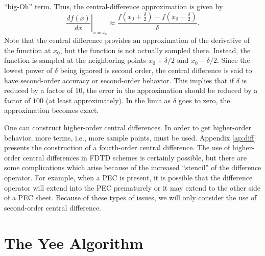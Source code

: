 ``big-Oh'' term.  Thus, the central-difference approximation is given
by
\begin{equation}
  \left.\frac{df(x)}{dx}\right|_{x=x_0} \approx
  \frac{f\!\left(x_0+\frac{\delta}{2}\right) -
        f\!\left(x_0-\frac{\delta}{2}\right)}{\delta}.
\end{equation}
Note that the central difference provides an approximation of the
derivative of the function at $x_0$, but the function is not actually
sampled there.  Instead, the function is sampled at the neighboring
points $x_0+\delta/2$ and $x_0-\delta/2$.  Since the lowest power of
$\delta$ being ignored is second order, the central difference is said
to have second-order accuracy or second-order behavior.  This implies
that if $\delta$ is reduced by a factor of $10$, the error in the
approximation should be reduced by a factor of $100$ (at least
approximately).  In the limit as $\delta$ goes to zero, the
approximation becomes exact.

One can construct higher-order central differences.  In order to get
higher-order behavior, more terms, i.e., more sample points, must be
used.  Appendix \ref{ap:diff} presents the construction of a
fourth-order central difference.  The use of higher-order central
differences in FDTD schemes is certainly possible, but there are some
complications which arise because of the increased ``stencil'' of the
difference operator.  For example, when a PEC is present, it is
possible that the difference operator will extend into the PEC
prematurely or it may extend to the other side of a PEC sheet.
Because of these types of issues, we will only consider the use of
second-order central difference.

\section{The Yee Algorithm}

